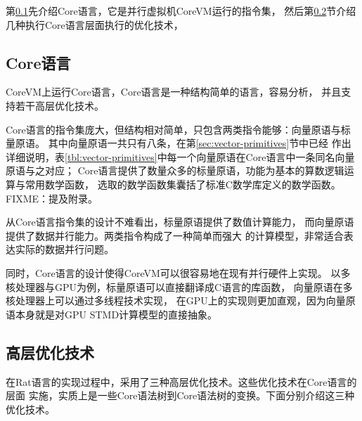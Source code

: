 第\ref{subsec:core-language}先介绍Core语言，它是并行虚拟机CoreVM运行的指令集，
然后第\ref{subsec:high-level-optimization}节介绍几种执行Core语言层面执行的优化技术，

\subsection{Core语言}\label{subsec:core-language}
CoreVM上运行Core语言，Core语言是一种结构简单的语言，容易分析，
并且支持若干高层优化技术。

Core语言的指令集庞大，但结构相对简单，只包含两类指令能够：向量原语与标量原语。
其中向量原语一共只有八条，在第\ref{sec:vector-primitives}节中已经
作出详细说明，表\ref{tbl:vector-primitives}中每一个向量原语在Core语言中一条同名向量原语与之对应；
Core语言提供了数量众多的标量原语，功能为基本的算数逻辑运算与常用数学函数，
选取的数学函数集囊括了标准C数学库定义的数学函数。
FIXME：提及附录。

从Core语言指令集的设计不难看出，标量原语提供了数值计算能力，
而向量原语提供了数据并行能力。两类指令构成了一种简单而强大
的计算模型，非常适合表达实际的数据并行问题。

同时，Core语言的设计使得CoreVM可以很容易地在现有并行硬件上实现。
以多核处理器与GPU为例，标量原语可以直接翻译成C语言的库函数，
向量原语在多核处理器上可以通过多线程技术实现，
在GPU上的实现则更加直观，因为向量原语本身就是对GPU STMD计算模型的直接抽象。


\subsection{高层优化技术}\label{subsec:high-level-optimization}
在Rat语言的实现过程中，采用了三种高层优化技术。这些优化技术在Core语言的层面
实施，实质上是一些Core语法树到Core语法树的变换。下面分别介绍这三种优化技术。

